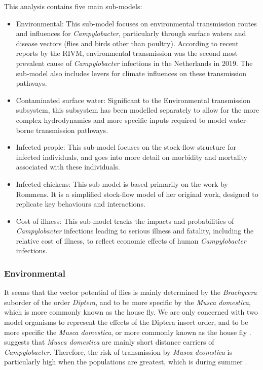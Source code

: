 This analysis contains five main sub-models:
\begin{itemize}
    \item Environmental: This sub-model focuses on environmental transmission routes and influences for \textit{Campylobacter}, particularly through surface waters and disease vectors (flies and birds other than poultry). According to recent reports by the RIVM, environmental transmission was the second most prevalent cause of \textit{Campylobacter} infections in the Netherlands in 2019. The sub-model also includes levers for climate influences on these transmission pathways.
    \item Contaminated surface water: Significant to the Environmental transmission subsystem, this subsystem has been modelled separately to allow for the more complex hydrodynamics and more specific inputs required to model water-borne transmission pathways.
    \item Infected people: This sub-model focuses on the stock-flow structure for infected individuals, and goes into more detail on morbidity and mortality associated with these individuals.
    \item Infected chickens: This sub-model is based primarily on the work by Rommens. It is a simplified stock-flow model of her original work, designed to replicate key behaviours and interactions.
    \item Cost of illness: This sub-model tracks the impacts and probabilities of \textit{Campylobacter} infections leading to serious illness and fatality, including the relative cost of illness, to reflect economic effects of human \textit{Campylobacter} infections.

\end{itemize}

\subsubsection*{Environmental}
It seems that the vector potential of flies is mainly determined by the \textit{Brachycera} suborder of the order \textit{Diptera}, and to be more specific by the \textit{Musca domestica}, which is more commonly known as the house fly.
We are only concerned with two model organisms to represent the effects of the Diptera insect order, and to be more specific the \textit{Musca domestica}, or more commonly known as the house fly \parencite{skovgard_retention_2011}. \citeauthor{skovgard_retention_2011} suggests that \textit{Musca domestica} are mainly short distance carriers of \textit{Campylobacter}. Therefore, the risk of transmission by \textit{Musca deomstica} is particularly high when the populations are greatest, which is during summer \parencite{royden_role_2016}.

